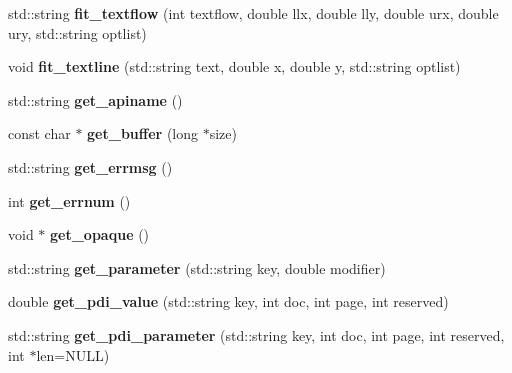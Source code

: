 \begin{DoxyCompactItemize}
\item 
\hypertarget{classPDFlib_ae0b36af24521c5e8e87998ea3eb31f40}{std\-::string {\bfseries fit\-\_\-textflow} (int textflow, double llx, double lly, double urx, double ury, std\-::string optlist)}\label{classPDFlib_ae0b36af24521c5e8e87998ea3eb31f40}

\item 
\hypertarget{classPDFlib_ad451733ee7844848d649a1e1a551623c}{void {\bfseries fit\-\_\-textline} (std\-::string text, double x, double y, std\-::string optlist)}\label{classPDFlib_ad451733ee7844848d649a1e1a551623c}

\item 
\hypertarget{classPDFlib_ae507e9334bca1ff843052d700f6ed1df}{std\-::string {\bfseries get\-\_\-apiname} ()}\label{classPDFlib_ae507e9334bca1ff843052d700f6ed1df}

\item 
\hypertarget{classPDFlib_a7f7680a512a49e0e13ae581a9e1e71b9}{const char $\ast$ {\bfseries get\-\_\-buffer} (long $\ast$size)}\label{classPDFlib_a7f7680a512a49e0e13ae581a9e1e71b9}

\item 
\hypertarget{classPDFlib_a4ecdc8130ec2268014398eec021466d1}{std\-::string {\bfseries get\-\_\-errmsg} ()}\label{classPDFlib_a4ecdc8130ec2268014398eec021466d1}

\item 
\hypertarget{classPDFlib_aa22b55c8aeb8c8bc42cc286003c29074}{int {\bfseries get\-\_\-errnum} ()}\label{classPDFlib_aa22b55c8aeb8c8bc42cc286003c29074}

\item 
\hypertarget{classPDFlib_a9ce25879cf687eabaa4c70419a279ce7}{void $\ast$ {\bfseries get\-\_\-opaque} ()}\label{classPDFlib_a9ce25879cf687eabaa4c70419a279ce7}

\item 
\hypertarget{classPDFlib_a6843d6ec87838920e015c5661b8a131c}{std\-::string {\bfseries get\-\_\-parameter} (std\-::string key, double modifier)}\label{classPDFlib_a6843d6ec87838920e015c5661b8a131c}

\item 
\hypertarget{classPDFlib_a29235793f31c496e5882e9000b80045e}{double {\bfseries get\-\_\-pdi\-\_\-value} (std\-::string key, int doc, int page, int reserved)}\label{classPDFlib_a29235793f31c496e5882e9000b80045e}

\item 
\hypertarget{classPDFlib_a2647307dc861fcbf3c0b994ea912afd0}{std\-::string {\bfseries get\-\_\-pdi\-\_\-parameter} (std\-::string key, int doc, int page, int reserved, int $\ast$len=\-N\-U\-L\-L)}\label{classPDFlib_a2647307dc861fcbf3c0b994ea912afd0}


\end{DoxyCompactItemize}
